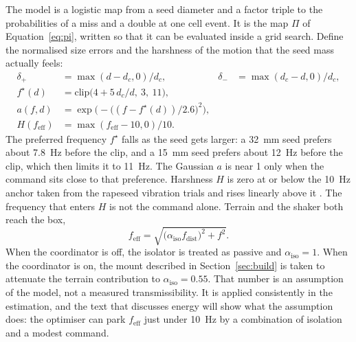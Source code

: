 The model is a logistic map from a seed diameter and a factor triple to the probabilities of a miss and a double at one cell event. It is the map $\Pi$ of Equation~\eqref{eq:pi}, written so that it can be evaluated inside a grid search. Define the normalised size errors and the harshness of the motion that the seed mass actually feels:
\begin{align}
\delta_{+} &= \max(d-d_c,0)/d_c, &
\delta_{-} &= \max(d_c-d,0)/d_c, \label{eq:delta}\\
f^{\star}(d) &= \mathrm{clip}\big(4 + 5\, d_c/d,\ 3,\ 11\big), \label{eq:fstar}\\
a(f,d) &= \exp\Big(-\big((f-f^{\star}(d))/2.6\big)^2\Big), \label{eq:agit}\\
H(f_{\mathrm{eff}}) &= \max(f_{\mathrm{eff}}-10, 0)/10. \label{eq:harsh}
\end{align}
The preferred frequency $f^{\star}$ falls as the seed gets larger: a 32~mm seed prefers about 7.8~Hz before the clip, and a 15~mm seed prefers about 12~Hz before the clip, which then limits it to 11~Hz. The Gaussian $a$ is near 1 only when the command sits close to that preference. Harshness $H$ is zero at or below the 10~Hz anchor taken from the rapeseed vibration trials and rises linearly above it \cite{zhang2024vib}. The frequency that enters $H$ is not the command alone. Terrain and the shaker both reach the box,
\begin{equation}
f_{\mathrm{eff}} = \sqrt{\big(\alpha_{\mathrm{iso}} f_{\mathrm{dist}}\big)^2 + f^2}.
\label{eq:feff}
\end{equation}
When the coordinator is off, the isolator is treated as passive and $\alpha_{\mathrm{iso}}=1$. When the coordinator is on, the mount described in Section~\ref{sec:build} is taken to attenuate the terrain contribution to $\alpha_{\mathrm{iso}}=0.55$. That number is an assumption of the model, not a measured transmissibility. It is applied consistently in the estimation, and the text that discusses energy will show what the assumption does: the optimiser can park $f_{\mathrm{eff}}$ just under 10~Hz by a combination of isolation and a modest command.


